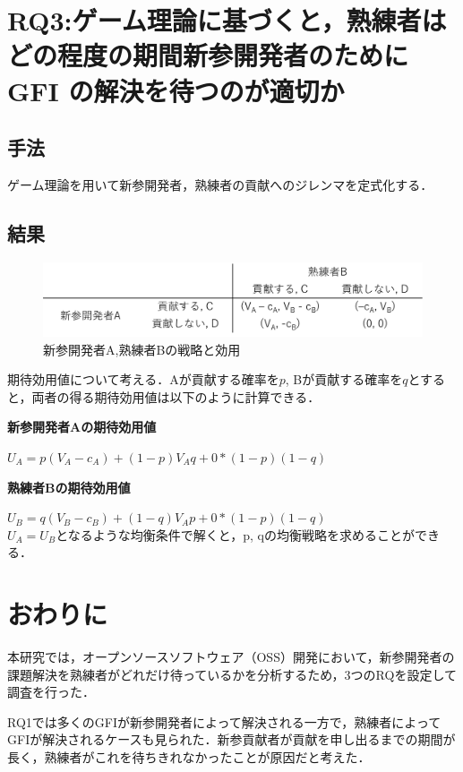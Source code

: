 \documentclass[twocolumn]{jarticle} %
\newcommand{\RQThree}{ゲーム理論に基づくと，熟練者はどの程度の期間新参開発者のために GFI の解決を待つのが適切か}
\begin{document}
\section{RQ3:\RQThree}\label{sec:rq3}

\subsection{手法}
ゲーム理論を用いて新参開発者，熟練者の貢献へのジレンマを定式化する．

\subsection{結果}
\begin{figure}[H]
\centerline{\includegraphics[width=0.9\linewidth]{@BSthesis2024_Nakai/BSthesis2024_Nakai_fig/ritoku.png}}
\caption{新参開発者A,熟練者Bの戦略と効用}
\label{fig:milestone}
\end{figure}

期待効用値について考える．Aが貢献する確率を$p$, Bが貢献する確率を$q$とすると，両者の得る期待効用値は以下のように計算できる．

\textbf{新参開発者Aの期待効用値}

$U_A = p(V_A -c_A) + (1 - p)V_Aq + 0*(1-p)(1-q)$

\textbf{熟練者Bの期待効用値}

$U_B = q(V_B -c_B) + (1 - q)V_Ap + 0*(1-p)(1-q)$
\\
$U_A =U_B$となるような均衡条件で解くと，p, qの均衡戦略を求めることができる．

\section{おわりに}\label{sec:conclusion}

本研究では，オープンソースソフトウェア（OSS）開発において，新参開発者の課題解決を熟練者がどれだけ待っているかを分析するため，3つのRQを設定して調査を行った．

RQ1では多くのGFIが新参開発者によって解決される一方で，熟練者によってGFIが解決されるケースも見られた．新参貢献者が貢献を申し出るまでの期間が長く，熟練者がこれを待ちきれなかったことが原因だと考えた．
\end{document}
